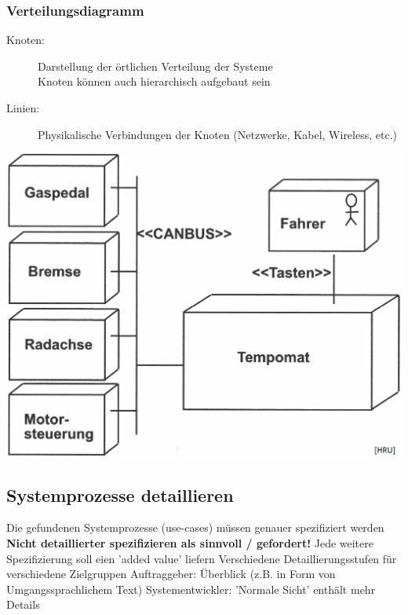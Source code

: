 \begin{minipage}[t]{0.5\columnwidth}
    \raggedright

    \subsubsection{Verteilungsdiagramm}
    
    \begin{description}
        \item[Knoten:] Darstellung der örtlichen Verteilung der Systeme \\
            Knoten können auch hierarchisch aufgebaut sein
        \item[Linien:] Physikalische Verbindungen der Knoten (Netzwerke, Kabel, Wireless, etc.)
    \end{description}
\end{minipage}
\hfill
\begin{minipage}[t]{0.46\columnwidth}
    
    \includegraphics[width=\columnwidth]{images/verteilungsdiagramm_tempomat.png}
\end{minipage}


\subsection{Systemprozesse detaillieren}

\begin{outline}
    \1 Die gefundenen Systemprozesse (use-cases) müssen genauer spezifiziert werden
        \2 \textbf{Nicht detaillierter spezifizieren als sinnvoll / gefordert!}
        \2 Jede weitere Spezifizierung soll eien 'added value' liefern
    \1 Verschiedene Detaillierungsstufen für verschiedene Zielgruppen
        \2 Auftraggeber: Überblick (z.B. in Form von Umgangssprachlichem Text)
        \2 Systementwickler: 'Normale Sicht' enthält mehr Details
\end{outline}


